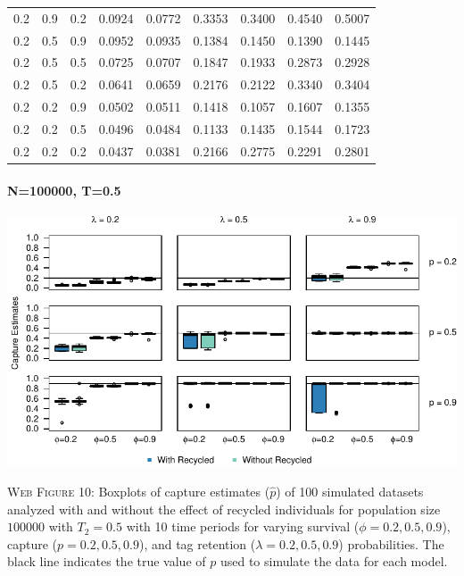 \documentclass[]{article}
\let\oldparagraph\paragraph
\renewcommand{\paragraph}[1]{\oldparagraph{#1}\mbox{}}
\begin{document}
\begin{table}[ht]
{\begin{tabular}{rrrrrrrrr}
  0.2 & 0.9 & 0.2 & 0.0924 & 0.0772 & 0.3353 & 0.3400 & 0.4540 & 0.5007 \\ 
  0.2 & 0.5 & 0.9 & 0.0952 & 0.0935 & 0.1384 & 0.1450 & 0.1390 & 0.1445 \\ 
  0.2 & 0.5 & 0.5 & 0.0725 & 0.0707 & 0.1847 & 0.1933 & 0.2873 & 0.2928 \\ 
  0.2 & 0.5 & 0.2 & 0.0641 & 0.0659 & 0.2176 & 0.2122 & 0.3340 & 0.3404 \\ 
  0.2 & 0.2 & 0.9 & 0.0502 & 0.0511 & 0.1418 & 0.1057 & 0.1607 & 0.1355 \\ 
  0.2 & 0.2 & 0.5 & 0.0496 & 0.0484 & 0.1133 & 0.1435 & 0.1544 & 0.1723 \\ 
  0.2 & 0.2 & 0.2 & 0.0437 & 0.0381 & 0.2166 & 0.2775 & 0.2291 & 0.2801 \\ 
   \hline
\end{tabular}
}
\endgroup
\end{table}

\newpage

\paragraph{N=100000, T=0.5}\label{n100000-t0.5-1}

\includegraphics{Appendix_files/figure-latex/figure10_capture_GJSTL3-1.pdf}

\textsc{Web Figure 10:} Boxplots of capture estimates (\(\hat{p}\)) of
100 simulated datasets analyzed with and without the effect of recycled
individuals for population size \(100000\) with \(T_2=0.5\) with 10 time
periods for varying survival (\(\phi=0.2,0.5,0.9\)), capture
(\(p=0.2,0.5,0.9\)), and tag retention (\(\lambda=0.2,0.5,0.9\))
probabilities. The black line indicates the true value of \(p\) used to
simulate the data for each model.
\end{document}
